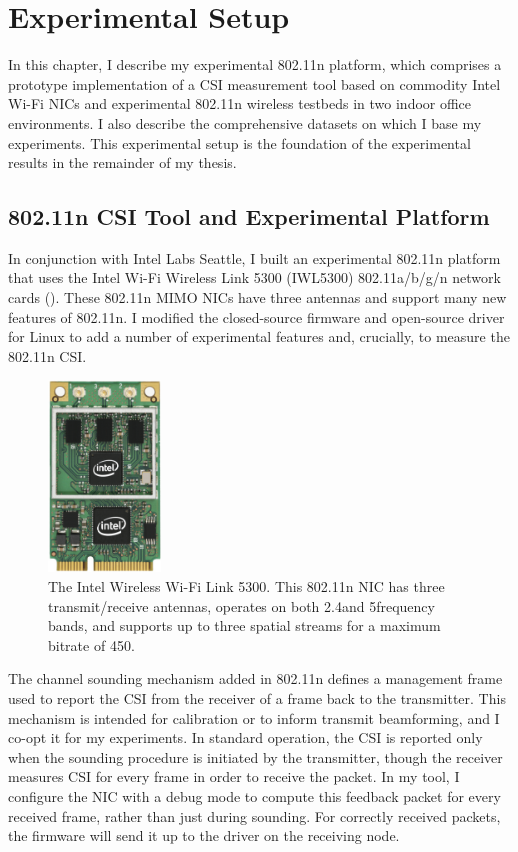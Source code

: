 \ifx\mainfile\undefined

\setcounter{chapter}{4} %
\fi

\cleardoublepage
\chapter{Experimental Setup}
\label{chap:tool}

In this chapter, I describe my experimental 802.11n platform, which comprises a prototype implementation of a CSI measurement tool based on commodity Intel Wi-Fi NICs and experimental 802.11n wireless testbeds in two indoor office environments. I also describe the comprehensive datasets on which I base my experiments. This experimental setup is the foundation of the experimental results in the remainder of my thesis.

\section{802.11n CSI Tool and Experimental Platform}
\label{sec:platform}
In conjunction with Intel Labs Seattle, I built an experimental 802.11n platform that uses the Intel Wi-Fi Wireless Link 5300 (IWL5300) 802.11a/b/g/n network cards (). These 802.11n MIMO NICs have three antennas and support many new features of 802.11n. I modified the closed-source firmware and open-source  driver for Linux to add a number of experimental features and, crucially, to measure the 802.11n CSI.

\begin{figure}
	\centering
	\includegraphics[height=2in]{figures/iwlwifi-5300.png}
	\caption{\label{fig:iwl5300}The Intel Wireless Wi-Fi Link 5300. This 802.11n NIC has three transmit/receive antennas, operates on both 2.4\GHz and 5\GHz frequency bands, and supports up to three spatial streams for a maximum bitrate of 450\Mbps.}
\end{figure}

 The channel sounding mechanism added in 802.11n defines a management frame used to report the CSI from the receiver of a frame back to the transmitter. This mechanism is intended for calibration or to inform transmit beamforming, and I co-opt it for my experiments. In standard operation, the CSI is reported only when the sounding procedure is initiated by the transmitter, though the receiver measures CSI for every frame in order to receive the packet. In my tool, I configure the NIC with a debug mode to compute this feedback packet for every received frame, rather than just during sounding. For correctly received packets, the firmware will send it up to the driver on the receiving node.

